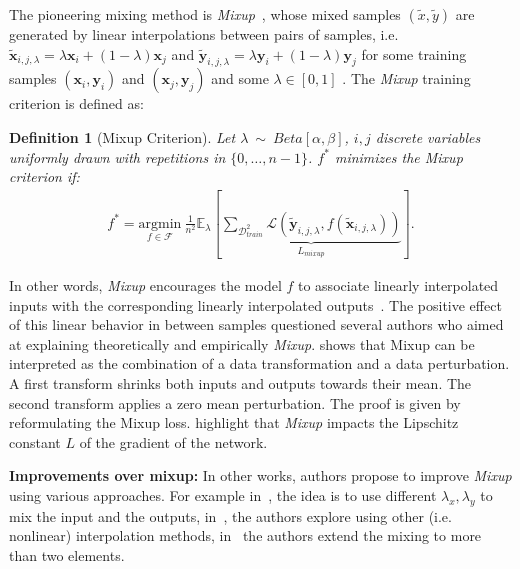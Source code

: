 \documentclass[twoside]{article}
\numberwithin{intassumption}{assumption}
\newtheorem{definition}{Definition}[section]
\begin{document}
The pioneering mixing method is \emph{Mixup}~\citep{zhang2017mixup}, whose mixed samples $(\tilde x, \tilde y)$ are generated by linear interpolations between pairs of samples, i.e. $\mathbf{\tilde x}_{i,j,\lambda} = \lambda \mathbf{x}_i + (1-\lambda)\mathbf{x}_j$ and $\mathbf{\tilde y}_{i,j,\lambda} = \lambda \mathbf{y}_i + (1-\lambda)\mathbf{y}_j$ for some training samples $(\mathbf{x}_i,\mathbf{y}_i)$ and $(\mathbf{x}_j, \mathbf{y}_j)$ and some $\lambda \in [0,1]$ . The \emph{Mixup} training criterion is defined as:
\begin{definition}[Mixup Criterion] Let $\lambda~\sim~Beta[\alpha, \beta]$, $i,j$ discrete variables uniformly drawn with repetitions in $\{0, \dots, n-1 \}$. $f^*$ minimizes the Mixup criterion if: 
\begin{align*}
f^* = \underset{f \in \mathcal{F}}{\mathrm{argmin}} \  \frac{1}{n^2} \mathbb{E}_{\lambda}\left[\underbrace{\sum_{\mathcal{D}_{train}^2}\mathcal{L} \left( \mathbf{\tilde y}_{i,j,\lambda} ,f(\mathbf{\tilde  x}_{i,j,\lambda})\right)}_{L_{mixup}}\right]. 
\end{align*}

\end{definition}

In other words, \emph{Mixup} encourages the model $f$ to associate linearly interpolated inputs with the corresponding linearly interpolated outputs~\citep{zhang2017mixup}. The positive effect of this linear behavior in between samples questioned several authors who aimed at explaining theoretically and empirically \emph{Mixup}. \citet{carratino2020mixup} shows that Mixup can be interpreted as the combination of a data transformation and a data perturbation. A first transform shrinks both inputs and outputs towards their mean. The second transform applies a zero mean perturbation. The proof is given by reformulating the Mixup loss. \citet{Lipmixup} highlight that \emph{Mixup} impacts the Lipschitz constant $L$ of the gradient of the network.


\textbf{Improvements over mixup:}
In other works, authors propose to improve \emph{Mixup} using various approaches. For example in~\citep{remix}, the idea is to use different $\lambda_x,\lambda_y$ to mix the input and the outputs, in~\citep{automix,mixmo,cutmixorig}, the authors explore using other (i.e. nonlinear) interpolation methods, in~\citep{batchmixup,kmixup,stackmix} the authors extend the mixing to more than two elements.
\end{document}
